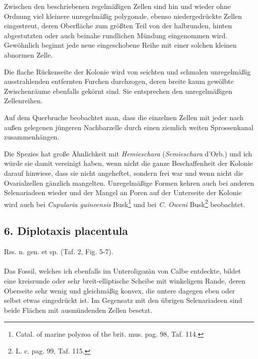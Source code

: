 \documentclass[a4paper, 11pt, oneside, german]{article}
\begin{document}
Zwischen den beschriebenen regelmäßigen Zellen sind hin und wieder ohne Ordnung viel kleinere unregelmäßig polygonale, ebenso niedergedrückte Zellen eingestreut, deren Oberfläche zum größten Teil von der halbrunden, hinten abgestutzten oder auch beinahe rundlichen Mündung eingenommen wird. Gewöhnlich beginnt jede neue eingeschobene Reihe mit einer solchen kleinen abnormen Zelle.

Die flache Rückenseite der Kolonie wird von seichten und schmalen unregelmäßig ausstrahlenden entfernten Furchen durchzogen, deren breite kaum gewölbte Zwischenräume ebenfalls gekörnt sind. Sie entsprechen den unregelmäßigen Zellenreihen.

Auf dem Querbruche beobachtet man, dass die einzelnen Zellen mit jeder nach außen gelegenen jüngeren Nachbarzelle durch einen ziemlich weiten Sprossenkanal zusammenhängen.

Die Spezies hat große Ähnlichkeit mit \emph{Hemieschara} (\emph{Semieschara} d'Orb.) und ich würde sie damit vereinigt haben, wenn nicht die ganze Beschaffenheit der Kolonie darauf hinwiese, dass sie nicht angeheftet, sondern frei war und wenn nicht die Ovarialzellen gänzlich mangelten. Unregelmäßige Formen kehren auch bei anderen Selenariadeen wieder und der Mangel an Poren auf der Unterseite der Kolonie wird auch bei \emph{Cupularia guineensis} Busk\footnote{Catal. of marine polyzoa of the brit. mus. pag. 98, Taf. 114.} und bei \emph{C. Oweni} Busk\footnote{L. c. pag. 99, Taf. 115.} beobachtet.
\subsection{6. Diplotaxis placentula}
\begin{center}
Rss. n. gen. et sp. (Taf. 2, Fig. 5-7).
\end{center}
\paragraph{}
Das Fossil, welches ich ebenfalls im Unteroligozän von Calbe entdeckte, bildet eine kreisrunde oder sehr breit-elliptische Scheibe mit winkeligem Rande, deren Oberseite sehr wenig und gleichmäßig konvex, die untere dagegen eben oder selbst etwas eingedrückt ist. Im Gegensatz mit den übrigen Selenariadeen sind beide Flächen mit ausmündenden Zellen besetzt.
\end{document}
